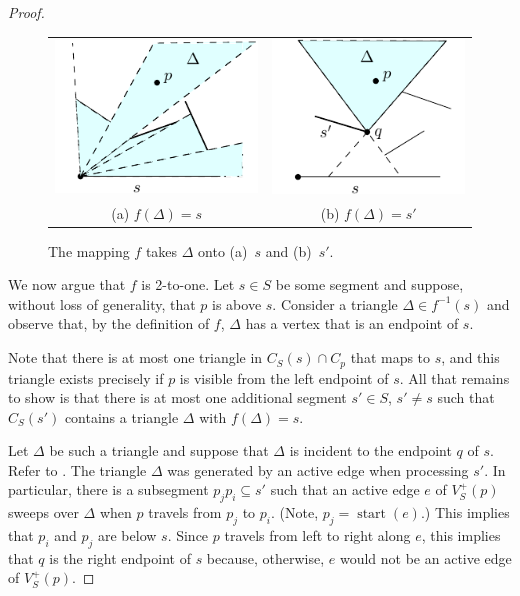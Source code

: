 \documentclass{patmorin}
\DeclareMathOperator{\start}{start}
\begin{document}
\begin{proof}
\begin{figure}
  \begin{center}
    \begin{tabular}{cc}
      \includegraphics{counting-a} &
      \includegraphics{counting-b} \\
      (a) $f(\Delta)=s$ & (b) $f(\Delta)=s'$
    \end{tabular}
  \end{center}
  \caption{The mapping $f$ takes $\Delta$ onto (a)~$s$ and (b)~$s'$.}
\end{figure}

We now argue that $f$ is 2-to-one.  Let $s\in S$ be some segment and
suppose, without loss of generality, that $p$ is above $s$.  Consider a
triangle $\Delta \in f^{-1}(s)$ and observe that, by the definition of $f$,
$\Delta$ has a vertex that is an endpoint of $s$.

Note that there is at most one triangle in $C_S(s)\cap C_p$ that maps
to $s$, and this triangle exists precisely if $p$ is visible from the
left endpoint of $s$.  All that remains to show is that there is at
most one additional segment $s'\in S$, $s'\neq s$ such that $C_S(s')$
contains a triangle $\Delta$ with $f(\Delta)=s$.

Let $\Delta$ be such a triangle and suppose that $\Delta$ is incident to
the endpoint $q$ of $s$.  Refer to .  The triangle
$\Delta$ was generated by an active edge when processing $s'$.  In
particular, there is a subsegment $p_j p_i\subseteq s'$ such that an active
edge $e$ of $V^+_S(p)$ sweeps over $\Delta$ when $p$ travels from $p_j$ to
$p_i$. (Note, $p_j=\start(e)$.) This implies that $p_i$ and $p_j$ are below
$s$. Since $p$ travels from left to right along $e$, this implies that $q$
is the right endpoint of $s$ because, otherwise, $e$ would not be an active
edge of $V^+_S(p)$.


\end{proof}
\end{document}
